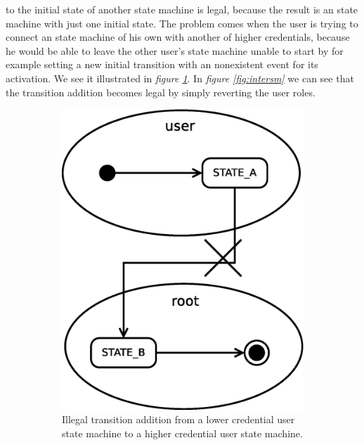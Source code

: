 to the initial state of another state machine is legal, because the result is an state machine with just one initial state. The problem 
comes when the user is trying to connect an state machine of his own with another of higher credentials, because he would be able to leave
the other user's state machine unable to start by for example setting a new initial transition with an nonexistent event for its activation.
We see it illustrated in \emph{figure \ref{fig:illegalintersm}}. In \emph{figure \ref{fig:intersm}} we can see that the transition
addition becomes legal by simply reverting the user roles.
\begin{figure}[h]
  \centering
  \begin{subfigure}[b]{0.45\textwidth}
    \centering
    \includegraphics[width=\textwidth,keepaspectratio]{img/illegalintersm}
    \caption{Illegal transition addition from a lower credential user state machine to a higher credential user state machine.}
    \label{fig:illegalintersm}
  \end{subfigure}
  ~
  \begin{subfigure}[b]{0.45\textwidth}

\end{subfigure}
\end{figure}

